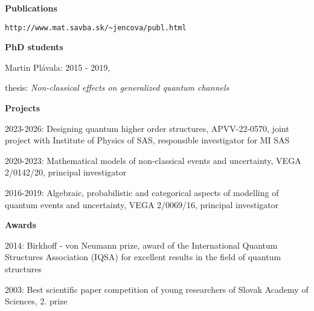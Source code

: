 \documentclass[12pt]{article}
\begin{document}
\noindent
\textbf{Publications}

\begin{verbatim}http://www.mat.savba.sk/~jencova/publ.html\end{verbatim}


\noindent
\textbf{PhD students}
\begin{description}[noitemsep,leftmargin=1.3cm, font=\normalfont]
\item{Martin Plávala:} 2015 - 2019, 

thesis: \emph{Non-classical effects on generalized quantum channels}
 
\end{description}

\noindent
\textbf{Projects}
\begin{description}[noitemsep,leftmargin=1.3cm, font=\normalfont]
\item{2023-2026:} Designing quantum higher order structures, APVV-22-0570, joint project
with Institute of Physics of SAS, responsible investigator for MI SAS
\item{2020-2023:} Mathematical models of non-classical events and uncertainty, VEGA
2/0142/20, principal investigator
\item{2016-2019:} Algebraic, probabilistic and categorical aspects of modelling of quantum
events and uncertainty, VEGA 2/0069/16, principal investigator
\end{description}

\noindent
\textbf{Awards}
\begin{description}[noitemsep,leftmargin=1.3cm, font=\normalfont]

\item{2014:} Birkhoff - von Neumann prize, award of the International Quantum  Structures
Association (IQSA) for excellent results in the field of quantum structures 
\item{2003: }  Best scientific paper competition of young researchers of Slovak Academy of Sciences, 2.
prize
\end{description}
\end{document}
